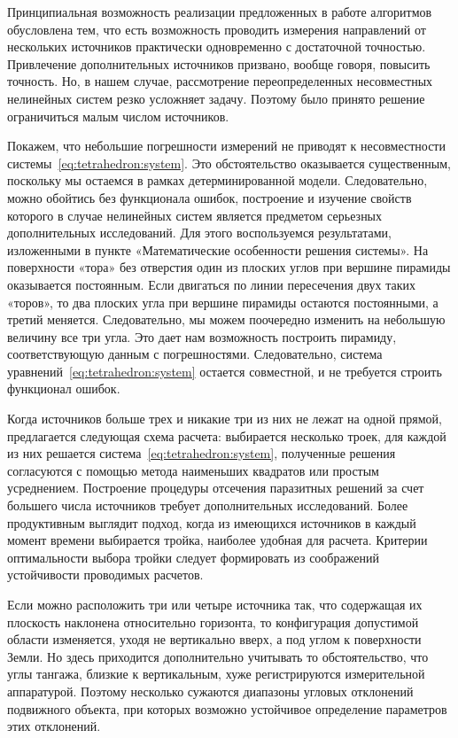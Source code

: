 \documentclass[../main.tex]{subfiles}
\begin{document}
Принципиальная возможность реализации предложенных в работе алгоритмов обусловлена тем, что есть возможность проводить измерения направлений от нескольких источников практически одновременно с достаточной точностью. Привлечение дополнительных источников призвано, вообще говоря, повысить точность. Но, в нашем случае, рассмотрение переопределенных несовместных нелинейных систем резко усложняет задачу. Поэтому было принято решение ограничиться малым числом источников.

Покажем, что небольшие погрешности измерений не приводят к несовместности системы~\eqref{eq:tetrahedron:system}. Это обстоятельство оказывается существенным, поскольку мы остаемся в рамках детерминированной модели. Следовательно, можно обойтись без функционала ошибок, построение и изучение свойств которого в случае нелинейных систем является предметом серьезных дополнительных исследований. Для этого воспользуемся результатами, изложенными в пункте «Математические особенности решения системы». На поверхности «тора» без отверстия один из плоских углов при вершине пирамиды оказывается постоянным. Если двигаться по линии пересечения двух таких «торов», то два плоских угла при вершине пирамиды остаются постоянными, а третий меняется. Следовательно, мы можем поочередно изменить на небольшую величину все три угла. Это дает нам возможность построить пирамиду, соответствующую данным с погрешностями. Следовательно, система уравнений~\eqref{eq:tetrahedron:system} остается совместной, и не требуется строить функционал ошибок.

Когда источников больше трех и никакие три из них не лежат на одной прямой, предлагается следующая схема расчета: выбирается несколько троек, для каждой из них решается система~\eqref{eq:tetrahedron:system}, полученные решения согласуются с помощью метода наименьших квадратов или простым усреднением. Построение процедуры отсечения паразитных решений за счет большего числа источников требует дополнительных исследований. Более продуктивным выглядит подход, когда из имеющихся источников в каждый момент времени выбирается тройка, наиболее удобная для расчета. Критерии оптимальности выбора тройки следует формировать из соображений устойчивости проводимых расчетов.

Если можно расположить три или четыре источника так, что содержащая их плоскость наклонена относительно горизонта, то конфигурация допустимой области изменяется, уходя не вертикально вверх, а под углом к поверхности Земли. Но здесь приходится дополнительно учитывать то обстоятельство, что углы тангажа, близкие к вертикальным, хуже регистрируются измерительной аппаратурой. Поэтому несколько сужаются диапазоны угловых отклонений подвижного объекта, при которых возможно устойчивое определение параметров этих отклонений.
\end{document}
